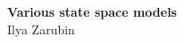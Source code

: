 



\begin{titlepage}

\thispagestyle{empty}   %


\begin{center}
\vspace*{2.cm}
{\textbf{\large{Various state space models}}} \\
\vspace*{2cm}
Ilya Zarubin\\

\end{center}


\vfill
\begin{flushright}
   \vspace*{0.5cm}
\end{flushright}


\end{titlepage}

\clearpage                %




\clearpage
\clearpage

%
%
%
%
%
\setcounter{page}{1}        %
%
%
%
%
%
\clearpage